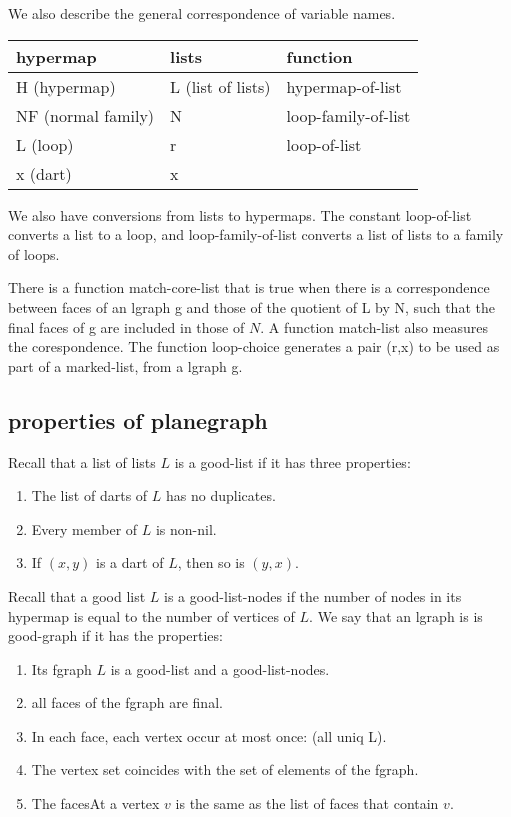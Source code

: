 \bigskip
We also describe the general correspondence of variable names.

\begin{tabular}{l l l}
\hline
{\bf hypermap} & {\bf lists} & {\bf function}\\ \hline
H (hypermap) & L (list of lists) & hypermap-of-list\\
NF (normal family) & N & loop-family-of-list \\
L (loop) & r & loop-of-list \\
x (dart) & x \\
\hline
\end{tabular}

\bigskip
We also have conversions from lists to hypermaps.  The constant loop-of-list converts a list to a loop,
and loop-family-of-list converts a list of lists to a family of loops.

There is a function match-core-list that is true when there is a correspondence between
faces of an lgraph g and those of the quotient of L by N, such that the final faces of g are included in those of $N$.
A function match-list also measures the corespondence.  The function loop-choice generates a pair (r,x)
to be used as part of a marked-list, from a lgraph g.





\subsection{properties of planegraph}

\begin{definition}
Recall that a list of lists $L$ is a good-list if it has three properties:
\begin{enumerate}
\item The list of darts of $L$ has no duplicates.
\item Every member of $L$ is non-nil.
\item If $(x,y)$ is a dart of $L$, then so is $(y,x)$.
\end{enumerate}
Recall that a good list $L$ is a good-list-nodes if 
the number of nodes in its hypermap is equal to the number
of vertices of $L$.
We say that an lgraph is is good-graph if it has the properties:
\begin{enumerate}
\item Its fgraph $L$ is a good-list and a good-list-nodes.
\item all faces of the fgraph are final.
\item In each face, each vertex occur at most once: (all uniq L).
\item The vertex set coincides with the set of elements of the fgraph.
\item The facesAt a vertex $v$ is the same as the list of faces that contain $v$.
\end{enumerate}
\end{definition}

